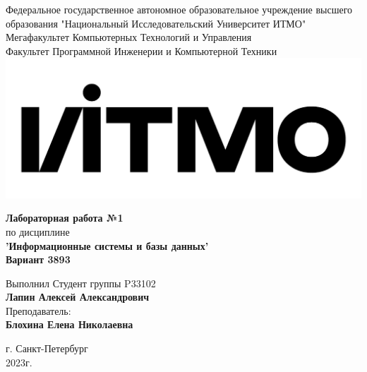 \documentclass[12pt,onecolumn]{article}
\begin{document}
\setcounter{tocdepth}{4}
\begin{center}
    Федеральное государственное автономное образовательное учреждение высшего образования "Национальный Исследовательский Университет ИТМО"\\ 
    Мегафакультет Компьютерных Технологий и Управления\\
    Факультет Программной Инженерии и Компьютерной Техники \\
    \includegraphics[scale=0.3]{image/itmo.jpg} %
\end{center}
\vspace{1cm}


\begin{center}
    \textbf{Лабораторная работа №1}\\
    по дисциплине\\
    \textbf{'Информационные системы и базы данных'}\\
    \textbf{Вариант 3893}
\end{center}

\vspace{2cm}

\begin{flushright}
  Выполнил Студент  группы P33102\\
  \textbf{Лапин Алексей Александрович}\\
  Преподаватель: \\
  \textbf{Блохина Елена Николаевна}\\
\end{flushright}

\vspace{6cm}
\begin{center}
    г. Санкт-Петербург\\
    2023г.
\end{center}

\newpage
\tableofcontents
\newpage
\end{document}

